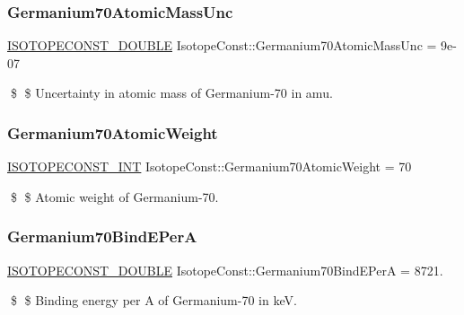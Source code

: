 \subsubsection{\texorpdfstring{Germanium70\+Atomic\+Mass\+Unc}{Germanium70AtomicMassUnc}}
{\footnotesize\ttfamily \mbox{\hyperlink{group___isotope_const-_macros_ga8f45a7272ce02c0b4c65c44636ed719a}{I\+S\+O\+T\+O\+P\+E\+C\+O\+N\+S\+T\+\_\+\+D\+O\+U\+B\+LE}} Isotope\+Const\+::\+Germanium70\+Atomic\+Mass\+Unc = 9e-\/07}

\$ \$ Uncertainty in atomic mass of Germanium-\/70 in amu. \mbox{\label{group___isotope_const-_germanium-_ge70_gabf4722be4520231089e73746df0bc5bb}} 
\subsubsection{\texorpdfstring{Germanium70\+Atomic\+Weight}{Germanium70AtomicWeight}}
{\footnotesize\ttfamily \mbox{\hyperlink{group___isotope_const-_macros_ga5f18360b3e99483a35c32d789e62621c}{I\+S\+O\+T\+O\+P\+E\+C\+O\+N\+S\+T\+\_\+\+I\+NT}} Isotope\+Const\+::\+Germanium70\+Atomic\+Weight = 70}

\$ \$ Atomic weight of Germanium-\/70. \mbox{\label{group___isotope_const-_germanium-_ge70_ga749d63c65c39e4f142659d0bbec53086}} 
\subsubsection{\texorpdfstring{Germanium70\+Bind\+E\+PerA}{Germanium70BindEPerA}}
{\footnotesize\ttfamily \mbox{\hyperlink{group___isotope_const-_macros_ga8f45a7272ce02c0b4c65c44636ed719a}{I\+S\+O\+T\+O\+P\+E\+C\+O\+N\+S\+T\+\_\+\+D\+O\+U\+B\+LE}} Isotope\+Const\+::\+Germanium70\+Bind\+E\+PerA = 8721.}

\$ \$ Binding energy per A of Germanium-\/70 in keV. \mbox{\label{group___isotope_const-_germanium-_ge70_ga39fe37b03a8ffbea3271f386eff81bc0}} 
